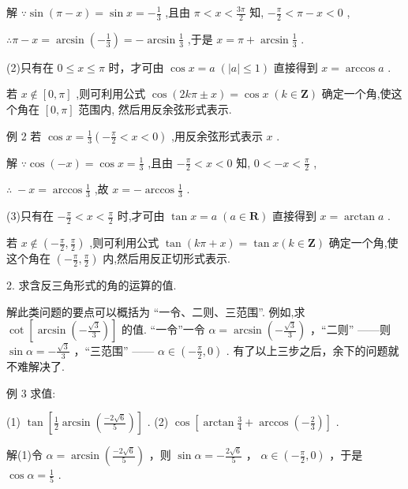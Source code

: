 \documentclass[10pt]{article}
\begin{document}
解 \(\because \sin \left( {\pi  - x}\right)  = \sin x =  - \frac{1}{3}\) ,且由 \(\pi  < x < \frac{3\pi }{2}\) 知, \(- \frac{\pi }{2} < \pi  - x < 0\) ,

\(\therefore \pi  - x = \arcsin \left( {-\frac{1}{3}}\right)  =  - \arcsin \frac{1}{3}\) ,于是 \(x = \pi  + \arcsin \frac{1}{3}\) .

(2)只有在 \(0 \leq  x \leq  \pi\) 时，才可由 \(\cos x = a\;\left( {\left| a\right|  \leq  1}\right)\) 直接得到 \(x = \arccos a\) .

若 \(x \notin  \left\lbrack  {0,\pi }\right\rbrack\) ,则可利用公式 \(\cos \left( {{2k\pi } \pm  x}\right)  = \cos x\;\left( {k \in  \mathbf{Z}}\right)\) 确定一个角,使这个角在 \(\left\lbrack  {0,\pi }\right\rbrack\) 范围内, 然后用反余弦形式表示.

例 2 若 \(\cos x = \frac{1}{3}\left( {-\frac{\pi }{2} < x < 0}\right)\) ,用反余弦形式表示 \(x\) .

解 \(\because \cos \left( {-x}\right)  = \cos x = \frac{1}{3}\) ,且由 \(- \frac{\pi }{2} < x < 0\) 知, \(0 <  - x < \frac{\pi }{2}\) ,

\(\therefore \; - x = \arccos \frac{1}{3}\) ,故 \(x =  - \arccos \frac{1}{3}\) .

(3)只有在 \(- \frac{\pi }{2} < x < \frac{\pi }{2}\) 时,才可由 \(\tan x = a\;\left( {a \in  \mathbf{R}}\right)\) 直接得到 \(x = \arctan a\) .

若 \(x \notin  \left( {-\frac{\pi }{2},\frac{\pi }{2}}\right)\) ,则可利用公式 \(\tan \left( {{k\pi } + x}\right)  = \tan x\left( {k \in  \mathbf{Z}}\right)\) 确定一个角,使这个角在 \(\left( {-\frac{\pi }{2},\frac{\pi }{2}}\right)\) 内,然后用反正切形式表示.

2. 求含反三角形式的角的运算的值.

解此类问题的要点可以概括为 “一令、二则、三范围”. 例如,求 \(\cot \left\lbrack  {\arcsin \left( {-\frac{\sqrt{3}}{3}}\right) }\right\rbrack\) 的值. “一令”一令 \(\alpha  = \arcsin \left( {-\frac{\sqrt{3}}{3}}\right)\) ，“二则” ——则 \(\sin \alpha  =  - \frac{\sqrt{3}}{3}\) ，“三范围” —— \(\alpha  \in  \left( {-\frac{\pi }{2},0}\right)\) . 有了以上三步之后，余下的问题就不难解决了.

例 3 求值:

(1) \(\tan \left\lbrack  {\frac{1}{2}\arcsin \left( \frac{-2\sqrt{6}}{5}\right) }\right\rbrack\) . (2) \(\cos \left\lbrack  {\arctan \frac{3}{4} + \arccos \left( {-\frac{2}{3}}\right) }\right\rbrack\) .

解(1)令 \(\alpha  = \arcsin \left( \frac{-2\sqrt{6}}{5}\right)\) ，则 \(\sin \alpha  =  - \frac{2\sqrt{6}}{5}\) ， \(\alpha  \in  \left( {-\frac{\pi }{2},0}\right)\) ，于是 \(\cos \alpha  = \frac{1}{5}\) .
\end{document}
